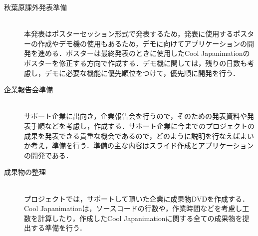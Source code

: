 \begin{description}
\item[秋葉原課外発表準備]\mbox{}\\
本発表はポスターセッション形式で発表するため，発表に使用するポスターの作成やデモ機の使用もあるため，デモに向けてアプリケーションの開発を進める．ポスターは最終発表のときに使用したCool Japanimationのポスターを修正する方向で作成する．デモ機に関しては，残りの日数も考慮し，デモに必要な機能に優先順位をつけて，優先順に開発を行う．
\item[企業報告会準備]\mbox{}\\
サポート企業に出向き，企業報告会を行うので，そのための発表資料や発表手順などを考慮し，作成する．サポート企業に今までのプロジェクトの成果を発表できる貴重な機会であるので，どのように説明を行なえばよいか考え，準備を行う．準備の主な内容はスライド作成とアプリケーションの開発である．
\item[成果物の整理]\mbox{}\\
プロジェクトでは，サポートして頂いた企業に成果物DVDを作成する．Cool Japanimationは，ソースコードの行数や，作業時間などを考慮し工数を計算したり，作成したCool Japanimationに関する全ての成果物を提出する準備を行う．
\end{description}

